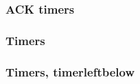 \documentclass{article}
\begin{document}
\subsubsection*{ACK timers}

\begin{chrono}[A,B]
  \testacktimer
\end{chrono}
\hfill
\begin{hchrono}[A,B]
  \testacktimer
\end{hchrono}
\vfill
\begin{chrono}
 \testacktimeri
\end{chrono}
\hfill
\begin{hchrono}
 \testacktimeri
\end{hchrono}
\vfill
\begin{chrono}[A=client,B=serveur]
\testvii
\end{chrono}
\begin{hchrono}[A=client,B=serveur]
\testvii
\end{hchrono}
\vfill
\begin{chrono}[timer time offset=2mm]
\testviii
\end{chrono}
\hfill
\begin{hchrono}
\testviii
\end{hchrono}
\vfill
\begin{chrono}
\testix
\end{chrono}
\hfill
\begin{hchrono}
\testix
\end{hchrono}

\subsubsection*{Timers}

\begin{chrono}[]
\testx
\end{chrono}
\hfill
\begin{chrono}[]
\testxi
\end{chrono}

\begin{hchrono}
\testx
\end{hchrono}

\bigskip

\begin{hchrono}
\testxi
\end{hchrono}
\vfill

\subsubsection*{Timers, timerleftbelow}
\end{document}
